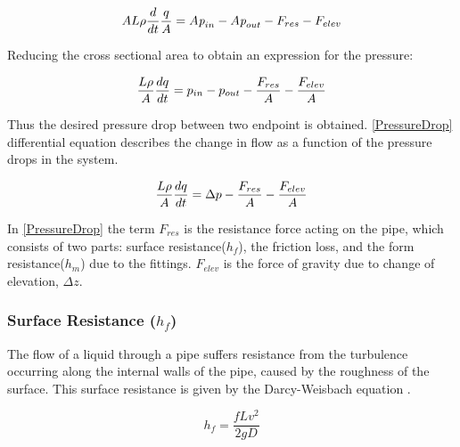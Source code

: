 \begin{equation}
    A L \rho \frac{d}{dt} \frac{q}{A} = A \textit{p}_{in} - A \textit{p}_{out} - F_{res} - F_{elev}\\
\end{equation}

Reducing the cross sectional area to obtain an expression for the pressure: 

\begin{equation}
    \frac{L \rho}{A} \frac{dq}{dt} =p_{in} - p_{out} - \frac{ F_{res}}{A} - \frac{ F_{elev}}{A} \\
\end{equation}

Thus the desired pressure drop between two endpoint is obtained. \eqref{PressureDrop} differential equation describes the change in flow as a function of the pressure drops in the system.

\begin{equation}
    \frac{L \rho}{A} \frac{dq}{dt} =\Delta p - \frac{ F_{res}}{A} - \frac{ F_{elev}}{A} \\
    \label{PressureDrop}
\end{equation}

In \eqref{PressureDrop} the term $F_{res}$ is the resistance force acting on the 
pipe, which consists of two parts: surface resistance($h_{f}$), the friction 
loss, and the form resistance($h_{m}$) due to the fittings. $F_{elev}$ is the force of gravity due to change of elevation, $\Delta z$.

\subsubsection{Surface Resistance (\texorpdfstring{$h_f$}{})} 
The flow of a liquid through a pipe suffers resistance from 
the turbulence occurring along the internal walls of the pipe, caused by the roughness of the surface. This surface resistance is given by the Darcy-Weisbach equation \cite{Design_Water}.

\begin{equation}
  h_f = \frac{fLv^2}{2gD}
  \label{Darcy}
\end{equation}

